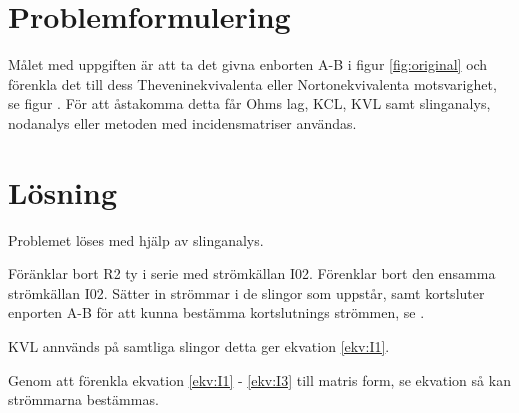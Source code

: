 \documentclass[a4paper,12pt]{article}
\begin{document}
\maketitle
\thispagestyle{empty}
\newpage

\section*{Problemformulering}
Målet med uppgiften är att ta det givna enborten A-B i figur \ref{fig:original} och förenkla det till dess Theveninekvivalenta eller Nortonekvivalenta motsvarighet, se figur \fig{}. För att åstakomma detta får Ohms lag, KCL, KVL samt slinganalys, nodanalys eller metoden med incidensmatriser användas.

\section*{Lösning}
Problemet löses med hjälp av slinganalys.


Föränklar bort R2 ty i serie med strömkällan I02. Förenklar bort den ensamma strömkällan I02. Sätter in strömmar i de slingor som uppstår, samt kortsluter enporten A-B för att kunna bestämma kortslutnings strömmen, se .


KVL annvänds på samtliga slingor detta ger ekvation \ref{ekv:I1}.


Genom att förenkla ekvation \ref{ekv:I1} - \ref{ekv:I3} till matris form, se ekvation så kan strömmarna bestämmas.

\end{document}
